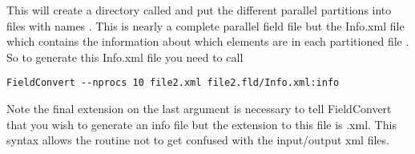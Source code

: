 This will create a directory called  and put the different 
parallel partitions into files with names 
. This is nearly a complete
parallel field file but the Info.xml file which contains the information about 
which elements are in each partitioned file . So to generate
this Info.xml file you need to call
\begin{lstlisting}[style=BashInputStyle] 
FieldConvert --nprocs 10 file2.xml file2.fld/Info.xml:info
\end{lstlisting}
Note the final  extension on the last argument is necessary to 
tell FieldConvert that you wish to generate an info file but the extension 
to this file is .xml. This syntax allows the routine not to get confused with 
the input/output xml files.


